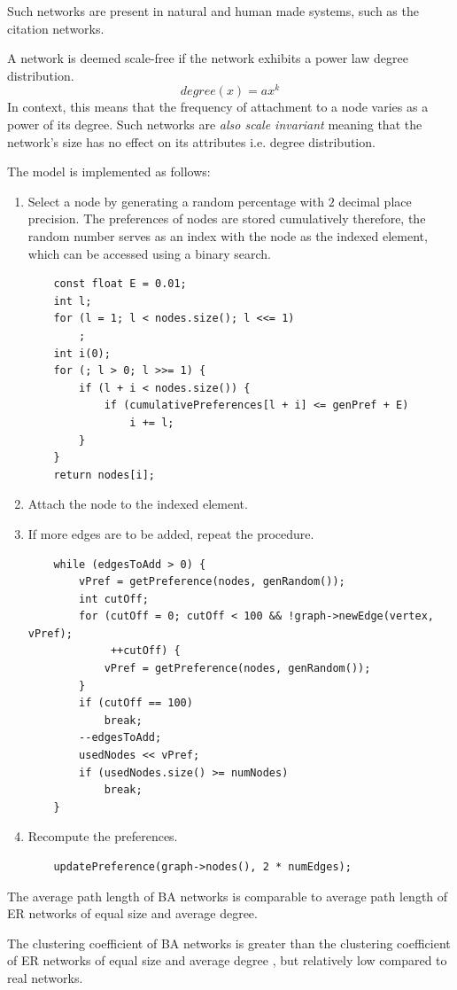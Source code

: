 \documentclass[a4paper,11pt,titlepage]{article}
\begin{document}
Such networks are present in natural and human made systems, such as the 
citation networks.

A network is deemed scale-free if the network exhibits a power law degree
distribution.
\[
degree(x) = ax^k
 \]
In context, this means that the frequency of attachment to a node
varies as a power of its degree. Such networks are \emph{also scale invariant} 
meaning that the network's size has no effect on its attributes i.e. degree
distribution.

The model is implemented as follows:
\begin{enumerate}
\item Select a node by generating a random percentage with $2$ decimal place
precision.
The preferences of nodes are stored cumulatively therefore, the random number
serves as an index with the node as the indexed element, which can be accessed
using a binary search.
\begin{lstlisting}
    const float E = 0.01;
    int l;
    for (l = 1; l < nodes.size(); l <<= 1)
        ;
    int i(0);
    for (; l > 0; l >>= 1) {
        if (l + i < nodes.size()) {
            if (cumulativePreferences[l + i] <= genPref + E)
                i += l;
        }
    }
    return nodes[i];
\end{lstlisting}
  \item Attach the node to the indexed element.
  \item If more edges are to be added, repeat the procedure.
\begin{lstlisting}
    while (edgesToAdd > 0) {
        vPref = getPreference(nodes, genRandom());
        int cutOff;
        for (cutOff = 0; cutOff < 100 && !graph->newEdge(vertex, vPref);
             ++cutOff) {
            vPref = getPreference(nodes, genRandom());
        }
        if (cutOff == 100)
            break;
        --edgesToAdd;
        usedNodes << vPref;
        if (usedNodes.size() >= numNodes)
            break;
    }
\end{lstlisting}
  \item Recompute the preferences.
\begin{lstlisting}
    updatePreference(graph->nodes(), 2 * numEdges);
\end{lstlisting}
\end{enumerate}

The average path length of BA networks is comparable to average path length of 
ER networks of equal size and average degree.

The clustering coefficient of BA networks is greater than the clustering
coefficient of ER networks of equal size and average degree \cite{oconn11}, but relatively low
compared to real networks.
\end{document}
